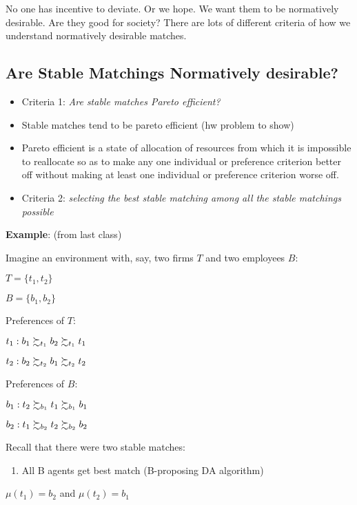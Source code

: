 \documentclass[11pt]{article}
\providecommand{\tightlist}{%
      \setlength{\itemsep}{0pt}\setlength{\parskip}{0pt}}
\begin{document}
No one has incentive to deviate. Or we hope. We want them to be
normatively desirable. Are they good for society? There are lots of
different criteria of how we understand normatively desirable matches.

    \subsection{Are Stable Matchings Normatively
desirable?}\label{are-stable-matchings-normatively-desirable}

\begin{itemize}
\item
  Criteria 1: \emph{Are stable matches Pareto efficient?}
\item
  Stable matches tend to be pareto efficient (hw problem to show)
\item
  Pareto efficient is a state of allocation of resources from which it
  is impossible to reallocate so as to make any one individual or
  preference criterion better off without making at least one individual
  or preference criterion worse off.
\item
  Criteria 2: \emph{selecting the best stable matching among all the
  stable matchings possible}
\end{itemize}

\textbf{Example}: (from last class)

    Imagine an environment with, say, two firms \(T\) and two employees
\(B\):

\(T = \{t_1, t_2\}\)

\(B = \{b_1, b_2\}\)

Preferences of \(T\):

\(t_1: \space b_1 \succsim_{t_1} b_2 \succsim_{t_1} t_1\)

\(t_2: \space b_2 \succsim_{t_2} b_1 \succsim_{t_2} t_2\)

Preferences of \(B\):

\(b_1: \space t_2 \succsim_{b_1} t_1 \succsim_{b_1} b_1\)

\(b_2: \space t_1 \succsim_{b_2} t_2 \succsim_{b_2} b_2\)

    Recall that there were two stable matches:

\begin{enumerate}
\def\labelenumi{(\arabic{enumi})}
\tightlist
\item
  All B agents get best match (B-proposing DA algorithm)
\end{enumerate}

\(\mu(t_1) = b_2\) and \(\mu(t_2) = b_1\)
\end{document}
